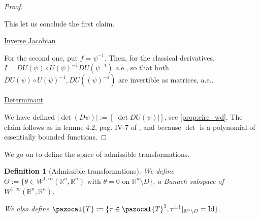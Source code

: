 \documentclass[english,a4paper,12pt,oneside]{scrbook}
\theoremstyle{break}
\newtheorem{defn}[equation]{Definition}
\newenvironment{mproof}[1][\proofname]{%
  \begin{proof}[#1]$ $\par\nobreak\ignorespaces
}{%
  \end{proof}
}
\renewcommand*{\proofname}{Proof}
\theoremstyle{remark}
\newcommand{\mR}{\mathbb{R}}
\newcommand{\cT}{\pazocal{T}}
\newcommand{\id}{\text{Id}}
\begin{document}
\begin{mproof}
This let us conclude the first claim.

\underline{Inverse Jacobian}

For the second one, put $f = \psi^{-1}$. Then, for the classical derivatives, $I = DU(\psi)\circ U(\psi)^{-1} DU(\psi^{-1})$ a.e., so that both $DU(\psi)\circ U(\psi)^{-1}, DU((\psi)^{-1})$ are invertible as matrices, a.e.. 

\underline{Determinant}

We have defined $|\det(D\psi)|:=[|\det DU(\psi)|]$, see \cref{prop:circ_wd}. The claim follows as in lemme 4.2, pag. IV-7 of \cite{murat}, and because $\det$ is a polynomial of essentially bounded functions.

\end{mproof}

We go on to define the space of admissible transformations.

\begin{defn}[Admissible transformations]
\label{def:adm}
We define $\Theta:=\{\theta \in W^{1,\infty}(\mR^n,\mR^n) \text{ with } \theta=0 \text{ on } \mR^n \setminus D\}$, a Banach subspace of $ W^{1,\infty}(\mR^n,\mR^n)$.


We also define $\cT:=\{\tau \in \cT^1, \tau^{\pm 1}|_{\mR^n\setminus D}=\id\}$. 

\end{defn}
\end{document}
